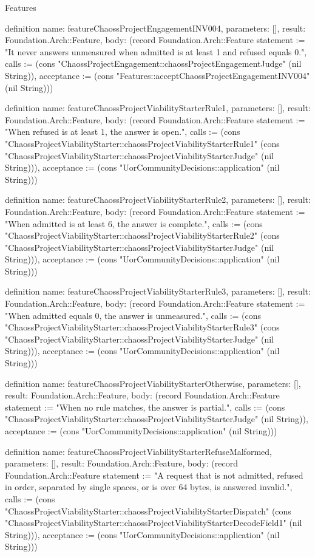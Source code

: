 \begin{lexlean}{Features}
\begin{semanticmodule}
definition{
  name: featureChaossProjectEngagementINV004,
  parameters: [],
  result: Foundation.Arch::Feature,
  body: (record Foundation.Arch::Feature {statement := "It never answers unmeasured when admitted is at least 1 and refused equals 0.", calls := (cons "ChaossProjectEngagement::chaossProjectEngagementJudge" (nil String)), acceptance := (cons "Features::acceptChaossProjectEngagementINV004" (nil String))})
}

definition{
  name: featureChaossProjectViabilityStarterRule1,
  parameters: [],
  result: Foundation.Arch::Feature,
  body: (record Foundation.Arch::Feature {statement := "When refused is at least 1, the answer is open.", calls := (cons "ChaossProjectViabilityStarter::chaossProjectViabilityStarterRule1" (cons "ChaossProjectViabilityStarter::chaossProjectViabilityStarterJudge" (nil String))), acceptance := (cons "UorCommunityDecisions::application" (nil String))})
}

definition{
  name: featureChaossProjectViabilityStarterRule2,
  parameters: [],
  result: Foundation.Arch::Feature,
  body: (record Foundation.Arch::Feature {statement := "When admitted is at least 6, the answer is complete.", calls := (cons "ChaossProjectViabilityStarter::chaossProjectViabilityStarterRule2" (cons "ChaossProjectViabilityStarter::chaossProjectViabilityStarterJudge" (nil String))), acceptance := (cons "UorCommunityDecisions::application" (nil String))})
}

definition{
  name: featureChaossProjectViabilityStarterRule3,
  parameters: [],
  result: Foundation.Arch::Feature,
  body: (record Foundation.Arch::Feature {statement := "When admitted equals 0, the answer is unmeasured.", calls := (cons "ChaossProjectViabilityStarter::chaossProjectViabilityStarterRule3" (cons "ChaossProjectViabilityStarter::chaossProjectViabilityStarterJudge" (nil String))), acceptance := (cons "UorCommunityDecisions::application" (nil String))})
}

definition{
  name: featureChaossProjectViabilityStarterOtherwise,
  parameters: [],
  result: Foundation.Arch::Feature,
  body: (record Foundation.Arch::Feature {statement := "When no rule matches, the answer is partial.", calls := (cons "ChaossProjectViabilityStarter::chaossProjectViabilityStarterJudge" (nil String)), acceptance := (cons "UorCommunityDecisions::application" (nil String))})
}

definition{
  name: featureChaossProjectViabilityStarterRefuseMalformed,
  parameters: [],
  result: Foundation.Arch::Feature,
  body: (record Foundation.Arch::Feature {statement := "A request that is not admitted, refused in order, separated by single spaces, or is over 64 bytes, is answered invalid.", calls := (cons "ChaossProjectViabilityStarter::chaossProjectViabilityStarterDispatch" (cons "ChaossProjectViabilityStarter::chaossProjectViabilityStarterDecodeField1" (nil String))), acceptance := (cons "UorCommunityDecisions::application" (nil String))})
}


\end{semanticmodule}
\end{lexlean}
